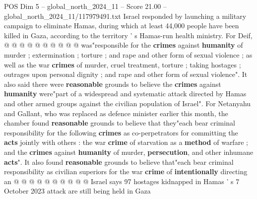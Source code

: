 \begin{textsample}{POS Dim 5 – global\_north\_2024\_11 – Score 21.00 – global\_north\_2024\_11/117979491.txt}
Israel responded by launching a military campaign to eliminate Hamas, during which at least 44,000 people have been killed in Gaza, according to the territory ' s Hamas-run health ministry.
For Deif, @ @ @ @ @ @ @ @ @ @ was"responsible for the \textbf{crimes} against \textbf{humanity} of murder ; extermination ; torture ; and rape and other form of sexual violence ; as well as the war \textbf{crimes} of murder, cruel treatment, torture ; taking hostages ; outrages upon personal dignity ; and rape and other form of sexual violence".
It also said there were \textbf{reasonable} grounds to believe the \textbf{crimes} against \textbf{humanity} were"part of a widespread and systematic attack directed by Hamas and other armed groups against the civilian population of Israel".
For Netanyahu and Gallant, who was replaced as defence minister earlier this month, the chamber found \textbf{reasonable} grounds to believe that they"each bear criminal responsibility for the following \textbf{crimes} as co-perpetrators for committing the \textbf{acts} jointly with others : the war \textbf{crime} of starvation as a \textbf{method} of warfare ; and the \textbf{crimes} against \textbf{humanity} of murder, \textbf{persecution}, and other inhumane \textbf{acts}".
It also found \textbf{reasonable} grounds to believe that"each bear criminal responsibility as civilian superiors for the war \textbf{crime} of \textbf{intentionally} directing an @ @ @ @ @ @ @ @ @ @ Israel says 97 hostages kidnapped in Hamas ' s 7 October 2023 attack are still being held in Gaza

\end{textsample}
